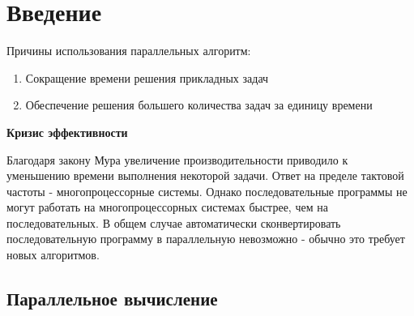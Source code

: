 



\section{Введение}

Причины использования параллельных алгоритм:

\begin{enumerate}
	\item Сокращение времени решения прикладных задач
	\item Обеспечение решения большего количества задач за единицу времени
\end{enumerate}

\noindent \textbf{Кризис эффективности}

Благодаря закону Мура увеличение производительности приводило к уменьшению времени выполнения некоторой задачи. Ответ на пределе тактовой частоты - многопроцессорные системы. Однако последовательные программы не могут работать на многопроцессорных системах быстрее, чем на последовательных. В общем случае автоматически сконвертировать последовательную программу в параллельную невозможно - обычно это требует новых алгоритмов.

\subsection{Параллельное вычисление}

